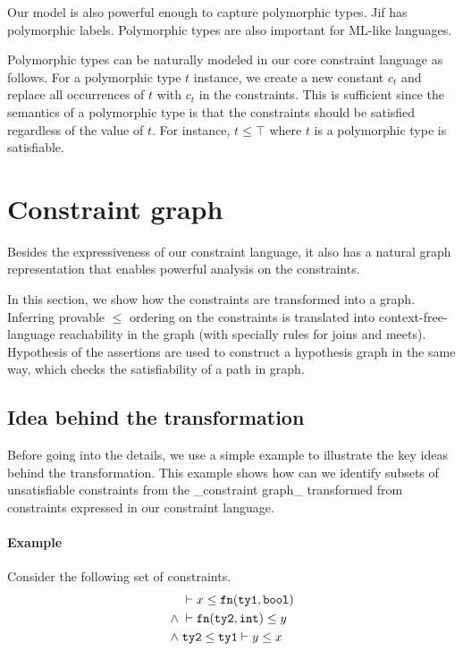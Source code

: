 Our model is also powerful enough to capture polymorphic types.  Jif
has polymorphic labels. Polymorphic types are also important for
ML-like languages.

Polymorphic types can be naturally modeled in our core constraint
language as follows. For a polymorphic type $t$ instance, we create a
new constant $c_t$ and replace all occurrences of $t$ with $c_t$ in
the constraints. This is sufficient since the semantics of a
polymorphic type is that the constraints should be satisfied
regardless of the value of $t$. For instance, $t\leq \top$ where $t$
is a polymorphic type is satisfiable.
\fi

\section{Constraint graph} 
\label{sec:graph}

Besides the expressiveness of our constraint language, it also has a
natural graph representation that enables powerful analysis on the
constraints.

In this section, we show how the constraints are transformed into a
graph. Inferring provable $\leq$ ordering on the constraints is
translated into context-free-language reachability in the graph (with
specially rules for joins and meets). Hypothesis of the assertions are
used to construct a hypothesis graph in the same way, which checks the
satisfiability of a path in graph.

\subsection{Idea behind the transformation}

Before going into the details, we use a simple example to illustrate
the key ideas behind the transformation. This example shows how can we
identify subsets of unsatisfiable constraints from the _constraint
graph_ transformed from constraints expressed in our constraint
language.

\paragraph{Example} Consider the following set of constraints.
\begin{align*}
      &\; \vdash x \leq \mathtt{fn} (\mathtt{ty1}, \mathtt{bool}) \\
\land &\; \vdash \mathtt{fn} (\mathtt{ty2}, \mathtt{int}) \leq y \\
\land &\; \mathtt{ty2} \leq \mathtt{ty1} \vdash y \leq x
\end{align*}

